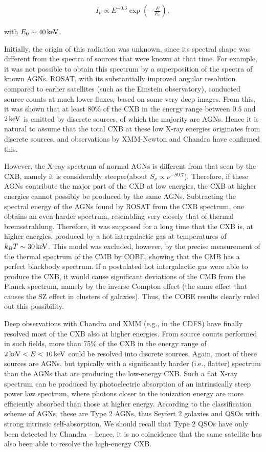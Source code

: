 \documentclass[a4paper,10pt]{article}
\begin{document}
\begin{align*}
    I_\nu \propto E^{-0.3}\exp\left(-\frac{E}{E_0}\right),
\end{align*}

{\noindent}with $E_0\sim40\,{\rm keV}$. 

{\noindent}Initially, the origin of this radiation was unknown, since its spectral shape was different from the spectra of sources that were known at that time. For example, it was not possible to obtain this spectrum by a superposition of the spectra of known AGNs. ROSAT, with its substantially improved angular resolution compared to earlier satellites (such as the Einstein observatory), conducted source counts at much lower fluxes, based on some very deep images. From this, it was shown that at least 80\% of the CXB in the energy range between $0.5$ and $2\,{\rm keV}$ is emitted by discrete sources, of which the majority are AGNs. Hence it is natural to assume that the total CXB at these low X-ray energies originates from discrete sources, and observations by XMM-Newton and Chandra have confirmed this.

{\noindent}However, the X-ray spectrum of normal AGNs is different from that seen by the CXB, namely it is considerably steeper(about $S_\nu\propto\nu^{-S0.7}$). Therefore, if these AGNs contribute the major part of the CXB at low energies, the CXB at higher energies cannot possibly be produced by the same AGNs. Subtracting the spectral energy of the AGNs found by ROSAT from the CXB spectrum, one obtains an even harder spectrum, resembling very closely that of thermal bremsstrahlung. Therefore, it was supposed for a long time that the CXB is, at higher energies, produced by a hot intergalactic gas at temperatures of $k_BT\sim30\,{\rm keV}$. This model was excluded, however, by the precise measurement of the thermal spectrum of the CMB by COBE, showing that the CMB has a perfect blackbody spectrum. If a postulated hot intergalactic gas were able to produce the CXB, it would cause significant deviations of the CMB from the Planck spectrum, namely by the inverse Compton effect (the same effect that causes the SZ effect in clusters of galaxies). Thus, the COBE results clearly ruled out this possibility.

{\noindent}Deep observations with Chandra and XMM (e.g., in the CDFS) have finally resolved most of the CXB also at higher energies. From source counts performed in such fields, more than 75\% of the CXB in the energy range of $2\,{\rm keV}<E<10\,{\rm keV}$ could be resolved into discrete sources. Again, most of these sources are AGNs, but typically with a significantly harder (i.e., flatter) spectrum than the AGNs that are producing the low-energy CXB. Such a flat X-ray spectrum can be produced by photoelectric absorption of an intrinsically steep power law spectrum, where photons closer to the ionization energy are more efficiently absorbed than those at higher energy. According to the classification scheme of AGNs, these are Type 2 AGNs, thus Seyfert 2 galaxies and QSOs with strong intrinsic self-absorption. We should recall that Type 2 QSOs have only been detected by Chandra -- hence, it is no coincidence that the same satellite has also been able to resolve the high-energy CXB.
\end{document}
